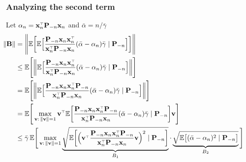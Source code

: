 \documentclass[10pt]{beamer}
\begin{document}
  \begin{frame}
    \frametitle{Analyzing the second term}
Let $\alpha_n = \x_n^\top\P_{-n}\x_n$ and $\bar\alpha=n/{\bar\gamma}$
\begin{align*}
\hspace{-8mm}\|\B\| &=
\Bigg\|\E\bigg[\E\Big[\frac{\P_{-n}\x_n\x_n^\top}{\x_n^\top\P_{-n}\x_n}
(\bar\alpha-\alpha_n) \bar\gamma\mid\P_{-n}\Big]\bigg]\Bigg\|\\
  &\leq \E\Bigg[\bigg\|\E\Big[\frac{\P_{-n}\x_n\x_n^\top}{\x_n^\top\P_{-n}\x_n}
(\bar\alpha-\alpha_n)
    \bar\gamma\mid\P_{-n}\Big]\bigg\|\Bigg]\\
  &=\E\Bigg[\bigg\|\E\Big[\frac{\P_{-n}\x_n\x_n^\top\P_{-n}}{\x_n^\top\P_{-n}\x_n}
(\bar\alpha-\alpha_n)
    \bar\gamma\mid\P_{-n}\Big]\bigg\|\Bigg]\\
  &=\E\Bigg[\max_{\v:\,\|\v\|=1}\v^\top\E\bigg[\frac{\P_{-n}\x_n\x_n^\top\P_{-n}}{\x_n^\top\P_{-n}\x_n}
  (\bar\alpha-\alpha_n)
    \bar\gamma\mid\P_{-n}\bigg]\v\Bigg]
  \\
&\leq \bar\gamma\, \E\Bigg[\max_{\v:\,\|\v\|=1}\underbrace{\sqrt{\E\bigg[
\Big(\v^\top
       \frac{\P_{-n}\x_n\x_n^\top\P_{-n}}{\x_n^\top\P_{-n}\x_n}\v\Big)^2\mid\P_{-n}\bigg]}}_{B_1}
       \cdot\underbrace{\sqrt{\E\big[(\bar\alpha-\alpha_n)^2 \mid\P_{-n}\big]}}_{B_2}\Bigg]
\end{align*}
\end{frame}
\end{document}
